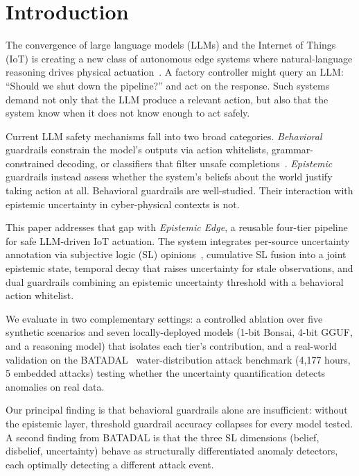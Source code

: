 \documentclass[conference]{IEEEtran}
\begin{document}
\section{Introduction}

The convergence of large language models (LLMs) and the Internet of Things (IoT) is creating a new class of autonomous edge systems where natural-language reasoning drives physical actuation~\cite{friha2024llmedge, alwahedi2024iotml}. A factory controller might query an LLM: ``Should we shut down the pipeline?'' and act on the response. Such systems demand not only that the LLM produce a relevant action, but also that the system know when it does not know enough to act safely.

Current LLM safety mechanisms fall into two broad categories. \textit{Behavioral} guardrails constrain the model's outputs via action whitelists, grammar-constrained decoding, or classifiers that filter unsafe completions~\cite{rebedea2023nemo, inan2023llama}. \textit{Epistemic} guardrails instead assess whether the system's beliefs about the world justify taking action at all. Behavioral guardrails are well-studied. Their interaction with epistemic uncertainty in cyber-physical contexts is not.

This paper addresses that gap with \textit{Epistemic Edge}, a reusable four-tier pipeline for safe LLM-driven IoT actuation. The system integrates per-source uncertainty annotation via subjective logic (SL) opinions~\cite{josang2016subjective}, cumulative SL fusion into a joint epistemic state, temporal decay that raises uncertainty for stale observations, and dual guardrails combining an epistemic uncertainty threshold with a behavioral action whitelist.

We evaluate in two complementary settings: a controlled ablation over five synthetic scenarios and seven locally-deployed models (1-bit Bonsai, 4-bit GGUF, and a reasoning model) that isolates each tier's contribution, and a real-world validation on the BATADAL~\cite{taormina2018battle} water-distribution attack benchmark (4{,}177 hours, 5 embedded attacks) testing whether the uncertainty quantification detects anomalies on real data.

Our principal finding is that behavioral guardrails alone are insufficient: without the epistemic layer, threshold guardrail accuracy collapses for every model tested. A second finding from BATADAL is that the three SL dimensions (belief, disbelief, uncertainty) behave as structurally differentiated anomaly detectors, each optimally detecting a different attack event.
\end{document}
